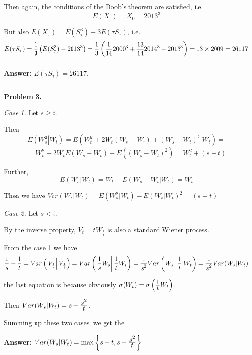 \documentclass[pdftex,12pt,a4paper]{article}
\begin{document}
Then again, the conditions of the Doob's theorem are satisfied, i.e.
$$
E(X_{\tau}) = X_{0} = 2013^{3}
$$\par

But also $E(X_{\tau}) = E(S_{\tau}^{3}) - 3 E(\tau S_{\tau})$, i.e. 
$$
E(\tau S_{\tau}) = \frac{\displaystyle 1}{\displaystyle 3}\left(E(S_{\tau}^{3}) - 2013^{3}\right) = \frac{\displaystyle 1}{\displaystyle 3}\left(\frac{\displaystyle 1}{\displaystyle 14}2000^{3} + \frac{\displaystyle 13}{\displaystyle 14}2014^{3} -2013^{3}\right) = 13\times 2009 = 26117
$$\[\]\par

\textbf{Answer:} $E(\tau S_{\tau}) = 26117$.
\[\]\par
\[\]\par

\textbf{Problem 3.}\par
\textit{Case 1.} Let $s \geqslant t$.\par
Then
$$
E\left(\left.W_{s}^{2}\right| W_{t}\right) = E\left(\left.W_{t}^{2} + 2 W_{t}(W_{s} - W_{t}) + (W_{s} - W_{t})^{2} \right| W_{t}\right) =$$ $$= W_{t}^{2} + 2W_{t}E(W_{s} - W_{t}) + E\left((W_{s} - W_{t})^{2}\right) = W_{t}^{2} + (s-t)
$$\par
Further,
$$
E(W_{s} | W_{t}) = W_{t} + E(W_{s} - W_{t}| W_{t}) = W_{t}
$$
\par
Then we have $Var(W_{s}|W_{t}) = E(W_{s}^{2}| W_{t}) - E(W_{s}|W_{t})^{2} = (s-t)$\[\]\par
\textit{Case 2.} Let $s < t$.\par
By the inverse property, $V_{t} = tW_{\frac{1}{t}}$ is also a standard Wiener process.\par
From the case 1 we have
$$
\frac{\displaystyle 1}{\displaystyle s} - \frac{\displaystyle 1}{\displaystyle t} = Var\left(\left.V_{\frac{1}{s}}\right| V_{\frac{1}{t}}\right) = Var\left(\left.\frac{\displaystyle 1}{\displaystyle s}W_{s}\right| \frac{\displaystyle 1}{\displaystyle t}W_{t}\right) = \frac{\displaystyle 1}{\displaystyle s^{2}} Var\left(W_{s}\left|\frac{\displaystyle 1}{\displaystyle t}\right.W_{t}\right) = \frac{\displaystyle 1}{\displaystyle s^{2}}Var(W_{s}| W_{t})
$$\par
the last equation is because obviously $\sigma(W_{t}) = \sigma\left(\frac{\displaystyle 1}{\displaystyle t}W_{t}\right)$.\par
Then $Var(W_{s}| W_{t}) = s - \frac{\displaystyle s^{2}}{\displaystyle t}$.\[\]\par
Summing up these two cases, we get the\[\]\par
\textbf{Answer:} $Var(W_{s}| W_{t}) = \max\left\{s-t, s - \frac{\displaystyle s^{2}}{\displaystyle t}\right\}$
\end{document}
